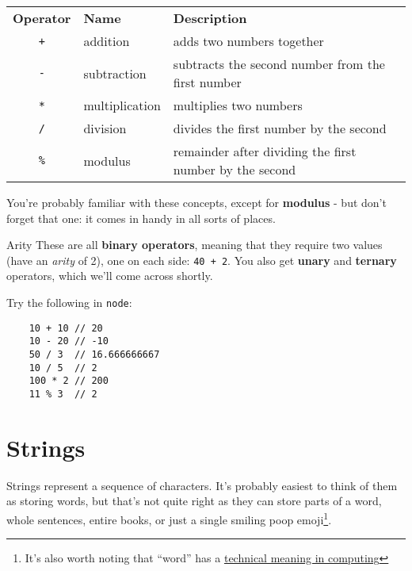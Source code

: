 \begin{small}
    \begin{tabu}{c l X}
        \textbf{Operator} & \textbf{Name} & \textbf{Description} \\
        \texttt{+}  & addition        & adds two numbers together \\
        \texttt{-}  & subtraction     & subtracts the second number from the first number \\
        \texttt{*}  & multiplication  & multiplies two numbers \\
        \texttt{/}  & division        & divides the first number by the second \\
        \texttt{\%} & modulus         & remainder after dividing the first number by the second
    \end{tabu}
\end{small}

\par\bigskip

You're probably familiar with these concepts, except for \textbf{modulus} - but don't forget that one: it comes in handy in all sorts of places.

\begin{infobox}{Arity}
    These are all \textbf{binary operators}, meaning that they require two values (have an \textit{arity} of 2), one on each side: \texttt{40 + 2}. You also get \textbf{unary} and \textbf{ternary} operators, which we'll come across shortly.
\end{infobox}

\pagebreak

Try the following in \texttt{node}:

\begin{verbatim}
    10 + 10 // 20
    10 - 20 // -10
    50 / 3  // 16.666666667
    10 / 5  // 2
    100 * 2 // 200
    11 % 3  // 2
\end{verbatim}


\section{Strings}

Strings represent a sequence of characters. It's probably easiest to think of them as storing words, but that's not quite right as they can store parts of a word, whole sentences, entire books, or just a single smiling poop emoji\footnote{It's also worth noting that ``word'' has a \href{https://en.wikipedia.org/wiki/Word_(computer_architecture)}{technical meaning in computing}}.
\\

